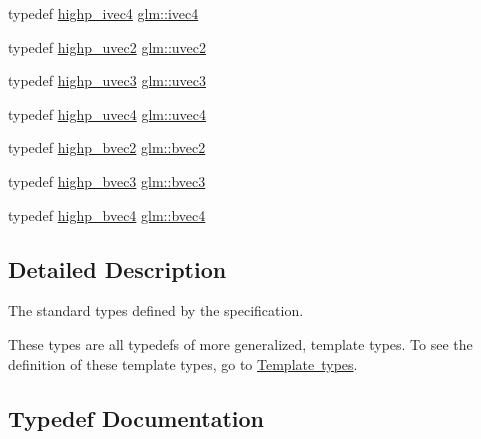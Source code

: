 \begin{DoxyCompactItemize}
\item 
typedef \mbox{\hyperlink{group__core__precision_gaff761e336e3b52f04e725fa85c6d36d1}{highp\+\_\+ivec4}} \mbox{\hyperlink{group__core__types_gaa4560ddc50320ea8f8a70d5c9c249fea}{glm\+::ivec4}}
\item 
typedef \mbox{\hyperlink{group__core__precision_ga34aca1cdf2130b1179fd7c5554bc1883}{highp\+\_\+uvec2}} \mbox{\hyperlink{group__core__types_gafd2041b45eff671aa8899d2c2835eee9}{glm\+::uvec2}}
\item 
typedef \mbox{\hyperlink{group__core__precision_ga2e16953ad75ce0c6d7faa921ca006ce5}{highp\+\_\+uvec3}} \mbox{\hyperlink{group__core__types_gac4ba593917841b859ba1683b8b52b8fa}{glm\+::uvec3}}
\item 
typedef \mbox{\hyperlink{group__core__precision_gae48d6e9a99afc33e6fa51e5d576dfd1a}{highp\+\_\+uvec4}} \mbox{\hyperlink{group__core__types_ga1c426d19627b32b14f0089f7f4ba7b1d}{glm\+::uvec4}}
\item 
typedef \mbox{\hyperlink{group__core__precision_gad8f63e4c7546320f6b72808fadfda3c2}{highp\+\_\+bvec2}} \mbox{\hyperlink{group__core__types_ga7523cf292181cf7daef3aa0a3267d8e3}{glm\+::bvec2}}
\item 
typedef \mbox{\hyperlink{group__core__precision_ga0e3365e13160aa93d2a9c68529a013ce}{highp\+\_\+bvec3}} \mbox{\hyperlink{group__core__types_ga3f07d6d37fc6fe875170fd5799685bcf}{glm\+::bvec3}}
\item 
typedef \mbox{\hyperlink{group__core__precision_gaa99e0301060bf06e7750c1c3591b6b4e}{highp\+\_\+bvec4}} \mbox{\hyperlink{group__core__types_ga6bb211b3d3bebae3867548d5673ca5cd}{glm\+::bvec4}}
\end{DoxyCompactItemize}


\subsection{Detailed Description}
The standard types defined by the specification. 

These types are all typedefs of more generalized, template types. To see the definition of these template types, go to \mbox{\hyperlink{group__core__template}{Template types}}. 

\subsection{Typedef Documentation}
\mbox{\label{group__core__types_ga7523cf292181cf7daef3aa0a3267d8e3}} 
